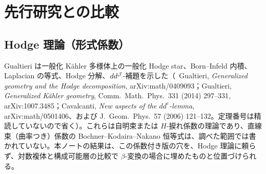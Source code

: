 \section{先行研究との比較}\label{sec:compare}
\subsection{Hodge 理論（形式係数）}
Gualtieri は一般化 Kähler 多様体上の一般化 Hodge star、Born--Infeld 内積、Laplacian の等式、Hodge 分解、$dd^{\mathcal J}$-補題を示した（\tC\ Gualtieri, \emph{Generalized geometry and the Hodge decomposition}, arXiv:math/0409093；Gualtieri, \emph{Generalized K\"ahler geometry}, Comm.\ Math.\ Phys.\ 331 (2014) 297--331, arXiv:1007.3485；Cavalcanti, \emph{New aspects of the $dd^c$-lemma}, arXiv:math/0501406、および J.\ Geom.\ Phys.\ 57 (2006) 121--132。定理番号は精読していないので省く\tQ）。これらは自明束または $H$-捩れ係数の理論であり、直線束（曲率つき）係数の Bochner--Kodaira--Nakano 恒等式は、調べた範囲では書かれていない。本ノートの結果は、この係数付き版の穴を、Hodge 理論に頼らず、対数複体と構成可能層の比較で $\beta$-変換の場合に埋めたものと位置づけられる。

